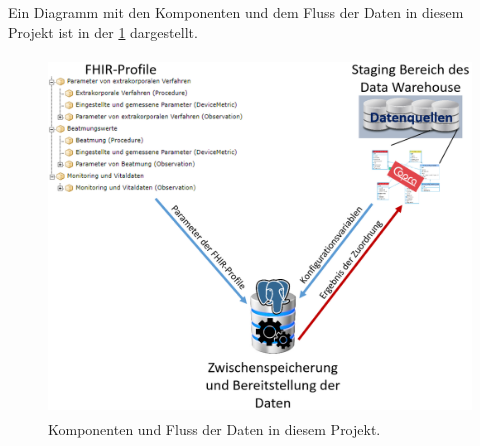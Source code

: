 Ein Diagramm mit den Komponenten und dem Fluss der Daten in diesem Projekt ist in der \ref{fig:components} dargestellt.

\begin{figure}[ht]
	\centering
	\includegraphics[height=9.5cm]{figures/master_diagram}
	\caption[Komponenten und Fluss der Daten] {Komponenten und Fluss der Daten in diesem Projekt.}
	\label{fig:components}
\end{figure}
